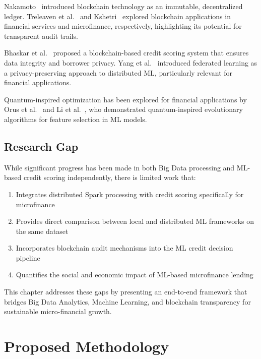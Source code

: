 \documentclass[preprint,12pt,authoryear]{elsarticle}
\begin{document}
Nakamoto~\cite{nakamoto2008bitcoin} introduced blockchain technology as an immutable, decentralized ledger. Treleaven et al.~\cite{treleaven2017blockchain} and Kshetri~\cite{kshetri2018blockchain} explored blockchain applications in financial services and microfinance, respectively, highlighting its potential for transparent audit trails.

Bhaskar et al.~\cite{bhaskar2021blockchain} proposed a blockchain-based credit scoring system that ensures data integrity and borrower privacy. Yang et al.~\cite{yang2019federated} introduced federated learning as a privacy-preserving approach to distributed ML, particularly relevant for financial applications.

Quantum-inspired optimization has been explored for financial applications by Orus et al.~\cite{orus2019quantum} and Li et al.~\cite{li2020quantum}, who demonstrated quantum-inspired evolutionary algorithms for feature selection in ML models.

\subsection{Research Gap}

While significant progress has been made in both Big Data processing and ML-based credit scoring independently, there is limited work that:
\begin{enumerate}
    \item Integrates distributed Spark processing with credit scoring specifically for microfinance
    \item Provides direct comparison between local and distributed ML frameworks on the same dataset
    \item Incorporates blockchain audit mechanisms into the ML credit decision pipeline
    \item Quantifies the social and economic impact of ML-based microfinance lending
\end{enumerate}

This chapter addresses these gaps by presenting an end-to-end framework that bridges Big Data Analytics, Machine Learning, and blockchain transparency for sustainable micro-financial growth.



\section{Proposed Methodology}
\label{sec:methodology}
\end{document}

